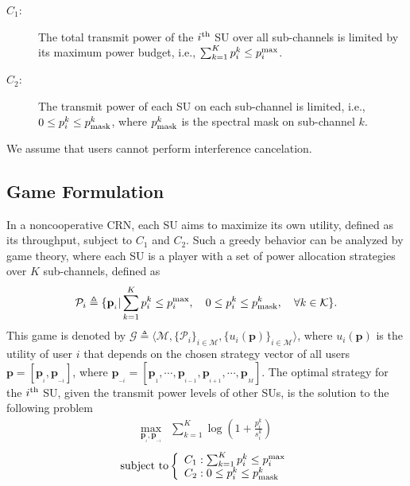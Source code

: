\documentclass[peerreview,onecolumn,11pt,draftclsnofoot]{IEEEtran}\usepackage{amsmath}\usepackage{amsfonts}\usepackage{epsfig}\usepackage{amssymb}\usepackage{graphicx}\usepackage{amssymb,amsmath}\usepackage{cite}\usepackage{color,soul}\newcommand\T{\rule{0pt}{3.1ex}}
\begin{document}
\begin{description}
    \item [$C_1$:] The total transmit power of the $i^{\scriptsize{\textnormal{th}}}$ SU over all sub-channels is limited by its maximum power budget, i.e.,
$\sum_{k=1}^{K} p^{k}_{i}\leq
    p_{i}^{\scriptsize{\textnormal{max}}}$.
\item [$C_2$:]The transmit power of each SU on each sub-channel is limited, i.e.,
$0\leq p^{k}_{i}\leq p^{k}_{\scriptsize{\textnormal{mask}}}$,
where $p^{k}_{\scriptsize{\textnormal{mask}}}$ is the spectral mask on sub-channel $k$.
\end{description}
We assume that users cannot perform interference cancelation.

\subsection{Game Formulation}
In a noncooperative CRN, each SU aims to maximize its own
utility, defined as its throughput, subject to $C_1$ and $C_2$. Such a greedy behavior can be analyzed by game theory, where each SU is a player with a set of power allocation strategies over $K$ sub-channels, defined as
\begin{equation}\label{Powerstratgy}
    \mathcal{P}_{i} \triangleq \{ \mathbf{p}_{_i} |  \sum_{k=1}^{K} p^{k}_{i} \leq  p_{i}^{\scriptsize{\textnormal{max}}}, \quad 0\leq p^{k}_{i}\leq  p^{k}_{\scriptsize{\textnormal{mask}}}, \quad  \forall k \in \mathcal{K}\}.
\end{equation}
This game is denoted by $\mathcal{G} \triangleq
\langle \mathcal{M},\{ \mathcal{P}_{i}\}_{i \in \mathcal{M}},
\{u_{i}(\mathbf{p})\}_{i\in \mathcal{M}}\rangle $, where $u_{i}(\mathbf{p})$ is the utility of user $i$ that depends on the chosen strategy vector of all users  $\mathbf{p}=[\mathbf{p}_{_i},\mathbf{p}_{_{-i}}]$, where
$\mathbf{p}_{_{-i}}=[\mathbf{p}_{_1},\cdots,\mathbf{p}_{_{i-1}},\mathbf{p}_{_{i+1}},\cdots,\mathbf{p}_{_M}]$. The optimal strategy for the
$i^{{\scriptsize{\textnormal{th}}}}$ SU, given the transmit power levels of other SUs, is the solution to the following
problem
\begin{eqnarray}\label{IWFutility1}
  \max_{\mathbf{p}_{_i}, \mathbf{p}_{_{-i}}} & \sum_{k=1}^{K}\log(1+\frac{p^{k}_{i}}{s^{k}_{i}})
 \end{eqnarray}
\[\mathrm{subject~to} \left\{
\begin{array}{l l}
 C_1: \sum_{k=1}^{K} p^{k}_{i} \leq  p_{i}^{\scriptsize{\textnormal{max}}} \nonumber \\
C_2: 0\leq p^{k}_{i}\leq  p^{k}_{\scriptsize{\textnormal{mask}}} \nonumber \\
\end{array} \right. \]
\end{document}
